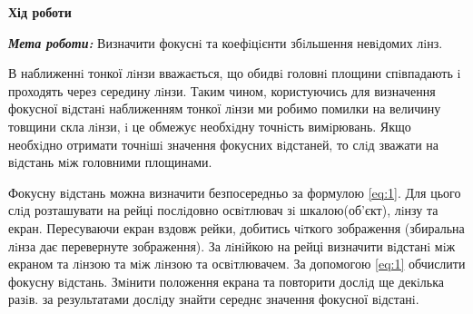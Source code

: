 \begin{center}
    \Large{\textbf{Хід роботи}}    
\end{center}

\vspace{1mm}

\textit{\textbf{Мета роботи:}} Визначити фокуснi та коефiцiєнти збiльшення невiдомих лiнз.
\bigbreak

В наближеннi тонкої лiнзи вважається, що обидвi головнi площини спiвпадають i проходять через
середину лiнзи. Таким чином, користуючись для визначення фокусної вiдстанi наближенням тонкої лiнзи
ми робимо помилки на величину товщини скла лiнзи, i це обмежує необхiдну точнiсть вимiрювань. Якщо
необхiдно отримати точнiшi значення фокусних вiдстаней, то слiд зважати на вiдстань мiж головними
площинами.

Фокусну вiдстань можна визначити безпосередньо за формулою \ref{eq:1}. Для цього слiд розташувати на
рейці послiдовно освiтлювач зi шкалою(об’єкт), лiнзу та екран. Пересуваючи екран вздовж рейки, добитись
чiткого зображення (збиральна лiнза дає перевернуте зображення). За лiнiйкою на рейці визначити
вiдстанi мiж екраном та лiнзою та мiж лiнзою та освiтлювачем. За допомогою \ref{eq:1} обчислити фокусну
вiдстань. Змiнити положення екрана та повторити дослiд ще декiлька разiв. за результатами дослiду 
знайти середнє значення фокусної вiдстанi.